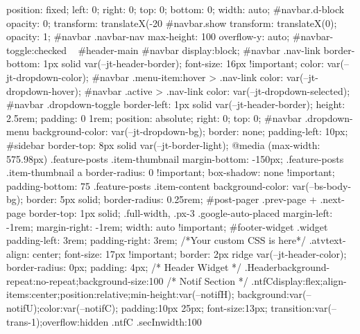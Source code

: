 {{{{{position: fixed;
left: 0;
right: 0;
top: 0;
bottom: 0;
width: auto;
}
#navbar.d-block {
opacity: 0;
transform: translateX(-20%
}
#navbar.show {
transform: translateX(0);
opacity: 1;
}
#navbar .navbar-nav {
max-height: 100%
overflow-y: auto;
}
#navbar-toggle:checked ~ #header-main #navbar {
display:block;
}
#navbar .nav-link {
border-bottom: 1px solid var(--jt-header-border);
font-size: 16px !important;
color: var(--jt-dropdown-color);
}
#navbar .menu-item:hover > .nav-link {
color: var(--jt-dropdown-hover);
}
#navbar .active > .nav-link {
color: var(--jt-dropdown-selected);
}
#navbar .dropdown-toggle {
border-left: 1px solid var(--jt-header-border);
height: 2.5rem;
padding: 0 1rem;
position: absolute;
right: 0;
top: 0;
}
#navbar .dropdown-menu {
background-color: var(--jt-dropdown-bg);
border: none;
padding-left: 10px;
}
#sidebar {
border-top: 8px solid var(--jt-border-light);
}
}
@media (max-width: 575.98px) {
.feature-posts .item-thumbnail {
margin-bottom: -150px;
}
.feature-posts .item-thumbnail a {
border-radius: 0 !important;
box-shadow: none !important;
padding-bottom: 75%
}
.feature-posts .item-content {
background-color: var(--bs-body-bg);
border: 5px solid;
border-radius: 0.25rem;
}
#post-pager .prev-page + .next-page {
border-top: 1px solid;
}
.full-width,
.px-3 .google-auto-placed {
margin-left: -1rem;
margin-right: -1rem;
width: auto !important;
}
#footer-widget .widget {
padding-left: 3rem;
padding-right: 3rem;
}
}
/*Your custom CSS is here*/
.atv{text-align: center;
font-size: 17px !important;
border: 2px ridge var(--jt-header-color);
border-radius: 0px;
padding: 4px;
}
/* Header Widget */ .Header{background-repeat:no-repeat;background-size:100%
/* Notif Section */ .ntfC{display:flex;align-items:center;position:relative;min-height:var(--notifH); background:var(--notifU);color:var(--notifC); padding:10px 25px; font-size:13px; transition:var(--trans-1);overflow:hidden} .ntfC .secIn{width:100%
}}}}}
